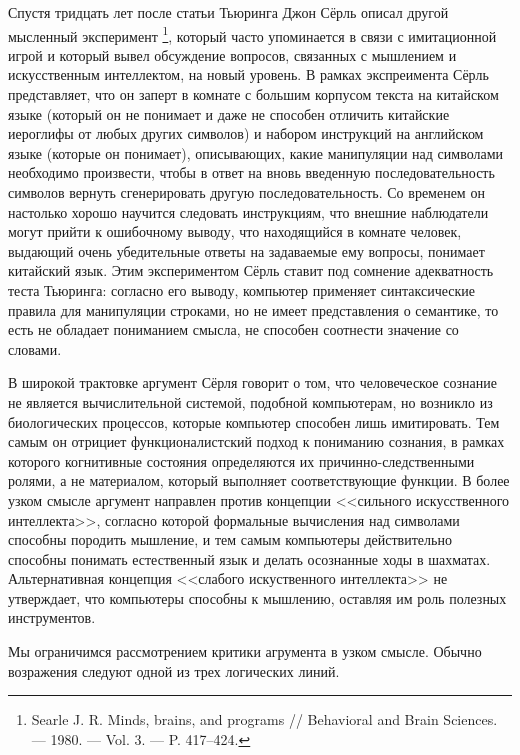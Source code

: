 \documentclass[12pt, specialist, subf, substylefile = spbu.rtx]{disser}
\begin{document}
Спустя тридцать лет после статьи Тьюринга Джон Сёрль описал другой мысленный эксперимент \footnote{\cite{Searle80minds} Searle J. R. Minds, brains, and programs // Behavioral and Brain Sciences. — 1980. — Vol. 3. — P. 417–424.}, который часто упоминается в связи с имитационной игрой и который вывел обсуждение вопросов, связанных с мышлением и искусственным интеллектом, на новый уровень. В рамках экспреимента Сёрль представляет, что он заперт в комнате с большим корпусом текста на китайском языке (который он не понимает и даже не способен отличить китайские иероглифы от любых других символов) и набором инструкций на английском языке (которые он понимает), описывающих, какие манипуляции над символами необходимо произвести, чтобы в ответ на вновь введенную последовательность символов вернуть сгенерировать другую последовательность. Со временем он настолько хорошо научится следовать инструкциям, что внешние наблюдатели могут прийти к ошибочному выводу, что находящийся в комнате человек, выдающий очень убедительные ответы на задаваемые ему вопросы, понимает китайский язык. Этим экспериментом Сёрль ставит под сомнение адекватность теста Тьюринга: согласно его выводу, компьютер применяет синтаксические правила для манипуляции строками, но не имеет представления о семантике, то есть не обладает пониманием смысла, не способен соотнести значение со словами.

В широкой трактовке аргумент Сёрля говорит о том, что человеческое сознание не является вычислительной системой, подобной компьютерам, но возникло из биологических процессов, которые компьютер способен лишь имитировать. Тем самым он отрициет функционалистский подход к пониманию сознания, в рамках которого когнитивные состояния определяются их причинно-следственными ролями, а не материалом, который выполняет соответствующие функции. В более узком смысле аргумент направлен против концепции <<сильного искусственного интеллекта>>, согласно которой формальные вычисления над символами способны породить мышление, и тем самым компьютеры действительно способны понимать естественный язык и делать осознанные ходы в шахматах. Альтернативная концепция <<слабого искуственного интеллекта>> не утверждает, что компьютеры способны к мышлению, оставляя им роль полезных инструментов.

Мы ограничимся рассмотрением критики агрумента в узком смысле. Обычно возражения следуют одной из трех логических линий.
\end{document}
